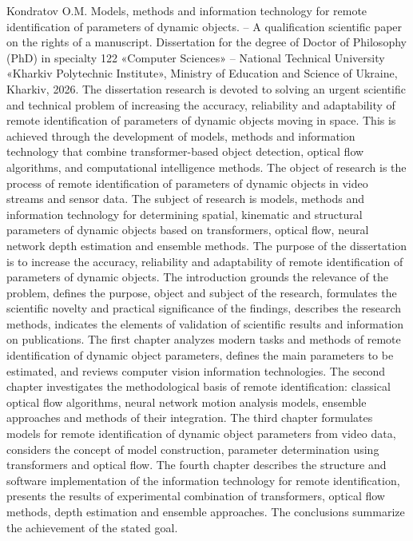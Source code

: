 \documentclass[
]{article}
\begin{document}
Kondratov O.M. Models, methods and information technology for remote identification of parameters of dynamic objects. -- A qualification scientific paper on the rights of a manuscript. Dissertation for the degree of Doctor of Philosophy (PhD) in specialty 122 «Computer Sciences» -- National Technical University «Kharkiv Polytechnic Institute», Ministry of Education and Science of Ukraine, Kharkiv, 2026. The dissertation research is devoted to solving an urgent scientific and technical problem of increasing the accuracy, reliability and adaptability of remote identification of parameters of dynamic objects moving in space. This is achieved through the development of models, methods and information technology that combine transformer-based object detection, optical flow algorithms, and computational intelligence methods. The object of research is the process of remote identification of parameters of dynamic objects in video streams and sensor data. The subject of research is models, methods and information technology for determining spatial, kinematic and structural parameters of dynamic objects based on transformers, optical flow, neural network depth estimation and ensemble methods. The purpose of the dissertation is to increase the accuracy, reliability and adaptability of remote identification of parameters of dynamic objects. The introduction grounds the relevance of the problem, defines the purpose, object and subject of the research, formulates the scientific novelty and practical significance of the findings, describes the research methods, indicates the elements of validation of scientific results and information on publications. The first chapter analyzes modern tasks and methods of remote identification of dynamic object parameters, defines the main parameters to be estimated, and reviews computer vision information technologies. The second chapter investigates the methodological basis of remote identification: classical optical flow algorithms, neural network motion analysis models, ensemble approaches and methods of their integration. The third chapter formulates models for remote identification of dynamic object parameters from video data, considers the concept of model construction, parameter determination using transformers and optical flow. The fourth chapter describes the structure and software implementation of the information technology for remote identification, presents the results of experimental combination of transformers, optical flow methods, depth estimation and ensemble approaches. The conclusions summarize the achievement of the stated goal.
\end{document}
